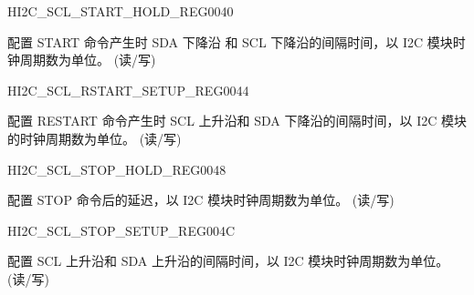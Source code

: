 \begin{register}{H}{I2C\_SCL\_START\_HOLD\_REG}{\hexprefix{}0040}\label{regdesc:I2CSCLSTARTHOLDREG}
%
%
\regnewline%
\begin{regdesc}\begin{reglist}
\label{fielddesc:I2CSCLSTARTHOLDTIME}\item [I2C\_SCL\_START\_HOLD\_TIME] 配置 START 命令产生时 SDA 下降沿 和 SCL 下降沿的间隔时间，以 I2C 模块时钟周期数为单位。 (读/写)
\end{reglist}\end{regdesc}
\end{register}


\begin{register}{H}{I2C\_SCL\_RSTART\_SETUP\_REG}{\hexprefix{}0044}\label{regdesc:I2CSCLRSTARTSETUPREG}
%
%
\regnewline%
\begin{regdesc}\begin{reglist}
\label{fielddesc:I2CSCLRSTARTSETUPTIME}\item [I2C\_SCL\_RSTART\_SETUP\_TIME] 配置 RESTART 命令产生时 SCL 上升沿和 SDA 下降沿的间隔时间，以 I2C 模块的时钟周期数为单位。 (读/写)
\end{reglist}\end{regdesc}
\end{register}


\begin{register}{H}{I2C\_SCL\_STOP\_HOLD\_REG}{\hexprefix{}0048}\label{regdesc:I2CSCLSTOPHOLDREG}
%
%
\regnewline%
\begin{regdesc}\begin{reglist}
\label{fielddesc:I2CSCLSTOPHOLDTIME}\item [I2C\_SCL\_STOP\_HOLD\_TIME] 配置 STOP 命令后的延迟，以 I2C 模块时钟周期数为单位。 (读/写)
\end{reglist}\end{regdesc}
\end{register}


\begin{register}{H}{I2C\_SCL\_STOP\_SETUP\_REG}{\hexprefix{}004C}\label{regdesc:I2CSCLSTOPSETUPREG}
%
%
\regnewline%
\begin{regdesc}\begin{reglist}
\label{fielddesc:I2CSCLSTOPSETUPTIME}\item [I2C\_SCL\_STOP\_SETUP\_TIME] 配置 SCL 上升沿和 SDA 上升沿的间隔时间，以 I2C 模块时钟周期数为单位。 (读/写)
\end{reglist}\end{regdesc}
\end{register}


